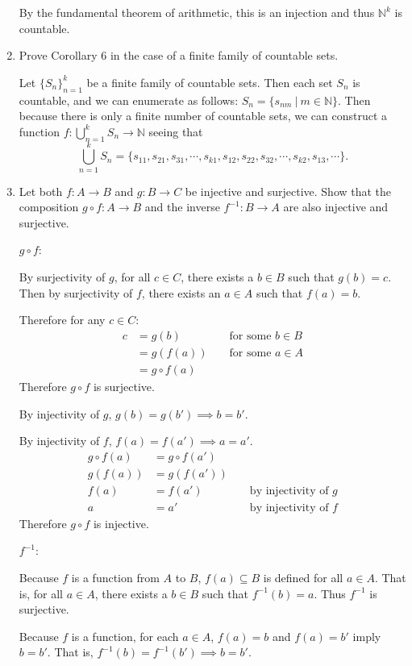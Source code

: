 \documentclass[a4paper,10pt]{book}
\theoremstyle{plain} %
\begin{document}
\begin{enumerate}
	By the fundamental theorem of arithmetic, this is an injection and thus $\mathbb{N}^k$ is countable.
	\item Prove Corollary 6 in the case of a finite family of countable sets.\par
	Let $\{S_n\}_{n=1}^k$ be a finite family of countable sets.
	Then each set $S_n$ is countable, and we can enumerate as follows: $S_n = \{s_{nm} \ | \ m \in \mathbb{N} \}$.
	Then because there is only a finite number of countable sets, we can construct a function $f: \bigcup_{n=1}^k S_n \to \mathbb{N}$ seeing that 
	\[
	\bigcup_{n=1}^k S_n = \{s_{11},s_{21},s_{31},\cdots, s_{k1}, s_{12}, s_{22},s_{32},\cdots,s_{k2},s_{13}, \cdots \}.
	\]
	\item Let both $f:A \to B$ and $g:B \to C$ be injective and surjective. Show that the composition $g \circ f:A \to B$ and the inverse $f^{-1}:B \to A$ are also injective and surjective.\par
	$g \circ f$:\par
	By surjectivity of $g$, for all $c \in C$, there exists a $b \in B$ such that $g(b)=c$.
	Then by surjectivity of $f$, there exists an $a \in A$ such that $f(a)=b$.\par
	Therefore for any $c \in C$:
	\begin{align*}
		c & = g(b) && \text{ for some $b \in B$}\\
		& = g(f(a))&& \text{ for some $a \in A$}\\
		& =g \circ f (a)
	\end{align*}
	Therefore $g \circ f$ is surjective.\par
	By injectivity of $g$, $g(b)=g(b') \implies b = b'$.\par
	By injectivity of $f$, $f(a)=f(a') \implies a = a'$.
	\begin{align*}
		g \circ f (a) & = g \circ f (a')\\
		g(f(a)) & = g(f(a')) \\
		f(a) & = f(a')&& \text{ by injectivity of $g$}\\
		a & = a'&& \text{ by injectivity of $f$}
	\end{align*}
	Therefore $g \circ f$ is injective.
	\par
	$f^{-1}$:\par
	Because $f$ is a function from $A$ to $B$, $f(a) \subseteq B$ is defined for all $a \in A$.
	That is, for all $a \in A$, there exists a $b \in B$ such that $f^{-1}(b) = a$.
	Thus $f^{-1}$ is surjective.\par
	Because $f$ is a function, for each $a \in A$, $f(a)=b$ and $f(a)=b'$ imply $b=b'$. That is, $f^{-1}(b)=f^{-1}(b') \implies b=b'$.

\end{enumerate}
\end{document}
